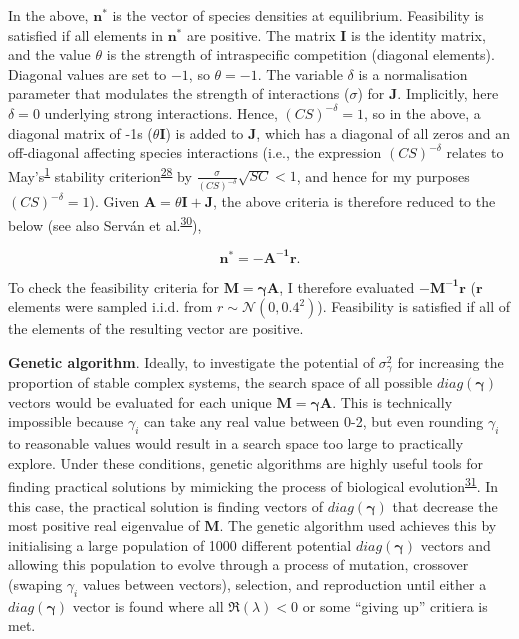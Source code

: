 \documentclass[]{article}
\begin{document}
In the above, \(\mathbf{n^{*}}\) is the vector of species densities at
equilibrium. Feasibility is satisfied if all elements in
\(\mathbf{n^{*}}\) are positive. The matrix \(\mathbf{I}\) is the
identity matrix, and the value \(\theta\) is the strength of
intraspecific competition (diagonal elements). Diagonal values are set
to \(-1\), so \(\theta = -1\). The variable \(\delta\) is a
normalisation parameter that modulates the strength of interactions
(\(\sigma\)) for \(\mathbf{J}\). Implicitly, here \(\delta = 0\)
underlying strong interactions. Hence, \((CS)^{-\delta} = 1\), so in the
above, a diagonal matrix of -1s (\(\theta \mathbf{I}\)) is added to
\(\mathbf{J}\), which has a diagonal of all zeros and an off-diagonal
affecting species interactions (i.e., the expression \((CS)^{-\delta}\)
relates to May's\textsuperscript{\protect\hyperlink{ref-May1972}{1}}
stability
criterion\textsuperscript{\protect\hyperlink{ref-Dougoud2018}{28}} by
\(\frac{\sigma}{(CS)^{-\delta}}\sqrt{SC} < 1\), and hence for my
purposes \((CS)^{-\delta} = 1\)). Given
\(\mathbf{A} = \theta\mathbf{I + J}\), the above criteria is therefore
reduced to the below (see also Serván et
al.\textsuperscript{\protect\hyperlink{ref-Servan2018}{30}}),

\[\mathbf{n^{*} = -A^{-1}r}.\]

To check the feasibility criteria for \(\mathbf{M = \gamma A}\), I
therefore evaluated \(\mathbf{-M^{-1}r}\) (\(\mathbf{r}\) elements were
sampled i.i.d. from \(r \sim \mathcal{N}(0, 0.4^{2})\)). Feasibility is
satisfied if all of the elements of the resulting vector are positive.

\textbf{Genetic algorithm}. Ideally, to investigate the potential of
\(\sigma^{2}_{\gamma}\) for increasing the proportion of stable complex
systems, the search space of all possible \(diag(\boldsymbol{\gamma})\)
vectors would be evaluated for each unique \(\mathbf{M = \gamma A}\).
This is technically impossible because \(\gamma_{i}\) can take any real
value between 0-2, but even rounding \(\gamma_{i}\) to reasonable values
would result in a search space too large to practically explore. Under
these conditions, genetic algorithms are highly useful tools for finding
practical solutions by mimicking the process of biological
evolution\textsuperscript{\protect\hyperlink{ref-Hamblin2013}{31}}. In
this case, the practical solution is finding vectors of
\(diag(\boldsymbol{\gamma})\) that decrease the most positive real
eigenvalue of \(\mathbf{M}\). The genetic algorithm used achieves this
by initialising a large population of 1000 different potential
\(diag(\boldsymbol{\gamma})\) vectors and allowing this population to
evolve through a process of mutation, crossover (swaping \(\gamma_{i}\)
values between vectors), selection, and reproduction until either a
\(diag(\boldsymbol{\gamma})\) vector is found where all
\(\Re(\lambda) < 0\) or some ``giving up'' critiera is met.
\end{document}
